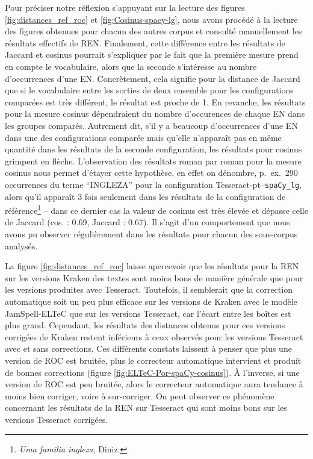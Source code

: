 Pour préciser notre réflexion s'appuyant sur la lecture des figures \ref{fig:distances_ref_roc} et \ref{fig:Cosinus-spacy-lg},
nous avons procédé à la lecture des figures obtenues pour chacun des autres corpus et consulté manuellement les résultats effectifs de REN. Finalement, cette différence entre les résultats de Jaccard et cosinus pourrait s'expliquer par le fait que la première mesure prend en compte le vocabulaire, alors que la seconde s'intéresse au nombre d'occurrences d'une EN. Concrètement, cela signifie pour la distance de Jaccard que si le vocabulaire entre les sorties de deux ensemble pour les configurations comparées est très différent, le résultat est proche de 1. 
En revanche, les résultats pour la mesure cosinus dépendraient du nombre d'occurences de chaque EN dans les groupes comparés. Autrement dit, s'il y a beaucoup d'occurrences d'une EN dans une des configurations comparée mais qu'elle n'apparaît pas en même quantité dans les résultats de la seconde configuration, les résultats pour cosinus grimpent en flèche. L'observation des résultats roman par roman pour la mesure cosinus nous permet d'étayer cette hypothèse, en effet on dénombre, p.\ ex.\, 290 occurrences du terme ``INGLEZA'' pour la configuration Tesseract-pt--\texttt{spaCy\_lg}, alors qu'il apparaît 3 fois seulement dans les résultats de la configuration de référence\footnote{\textit{Uma familia ingleza}, Diniz.} -- dans ce dernier cas la valeur de cosinus est très élevée et dépasse celle de Jaccard (cos. : 0.69, Jaccard : 0.67). Il s'agit d'un comportement que nous avons pu observer régulièrement dans les résultats pour chacun des sous-corpus analysés.

La figure \ref{fig:distances_ref_roc} laisse apercevoir que les résultats pour la REN sur les versions Kraken des textes sont moins bons de manière générale que pour les versions produites avec Tesseract. Toutefois, il semblerait que la correction automatique soit un peu plus efficace sur les versions de Kraken avec le modèle JamSpell-ELTeC que sur les versions Tesseract, car l'écart entre les boîtes est plus grand. Cependant, les résultats des distances obtenus pour ces versions corrigées de Kraken restent inférieurs à ceux observés pour les versions Tesseract avec et sans corrections. Ces différents constats laissent à penser que plus une version de ROC est bruitée, plus le correcteur automatique intervient et produit de bonnes corrections (figure \ref{fig:ELTeC-Por-spaCy-cosinus}). À l'inverse, si une version de ROC est peu bruitée, alors le correcteur automatique aura tendance à moins bien corriger, voire à sur-corriger. On peut observer ce phénomène concernant les résultats de la REN sur Tesseract qui sont moins bons sur les versions Tesseract corrigées. 


